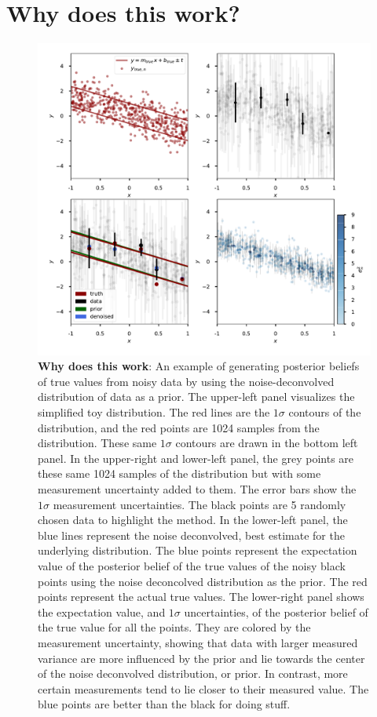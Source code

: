 \documentclass[modern]{aastex61}
\begin{document}
\section{Why does this work?}
\begin{figure}
\centering
  \includegraphics[width=\textwidth]{toy.pdf}
\caption{ {\bf Why does this work}: An example of generating posterior beliefs of true values from noisy data by using the noise-deconvolved distribution of data as a prior. The upper-left panel visualizes the simplified toy distribution. The red lines are the $1\sigma$ contours of the distribution, and the red points are 1024 samples from the distribution. These same $1\sigma$ contours are drawn in the bottom left panel. In the upper-right and lower-left panel, the grey points are these same 1024 samples of the distribution but with some measurement uncertainty added to them. The error bars show the $1\sigma$ measurement uncertainties. The black points are 5 randomly chosen data to highlight the method. In the lower-left panel, the blue lines represent the noise deconvolved, best estimate for the underlying distribution. The blue points represent the expectation value of the posterior belief of the true values of the noisy black points using the noise deconcolved distribution as the prior. The red points represent the actual true values. The lower-right panel shows the expectation value, and $1\sigma$ uncertainties, of the posterior belief of the true value for all the points. They are colored by the measurement uncertainty, showing that data with larger measured variance are more influenced by the prior and lie towards the center of the noise deconvolved distribution, or prior. In contrast, more certain measurements tend to lie closer to their measured value. The blue points are better than the black for doing stuff.}
\label{fig:toy}
\end{figure}
\end{document}
